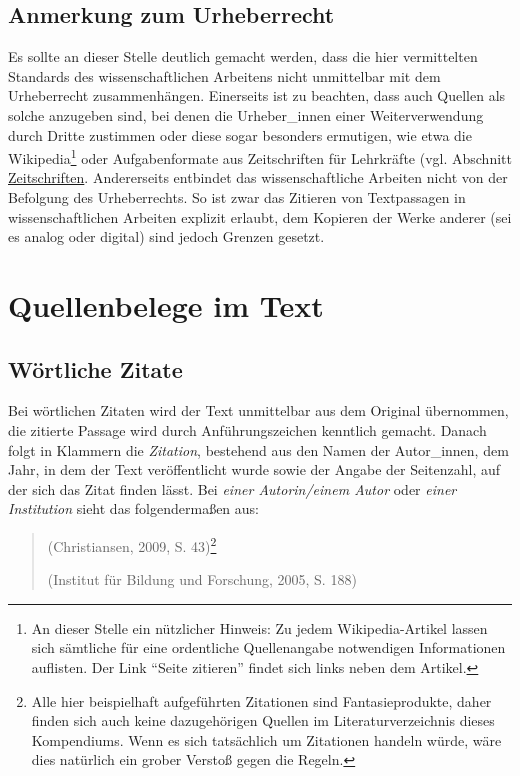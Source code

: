 \documentclass[
  bibliography=totoc,
  oneside,
  12pt,
  a4paper]{scrbook}
\begin{document}
\hypertarget{anmerkung-zum-urheberrecht}{%
\subsection*{Anmerkung zum Urheberrecht}\label{anmerkung-zum-urheberrecht}}

Es sollte an dieser Stelle deutlich gemacht werden, dass die hier
vermittelten Standards des wissenschaftlichen Arbeitens nicht
unmittelbar mit dem Urheberrecht zusammenhängen. Einerseits ist zu
beachten, dass auch Quellen als solche anzugeben sind, bei denen die
Urheber\_innen einer Weiterverwendung durch Dritte zustimmen oder diese
sogar besonders ermutigen, wie etwa die Wikipedia\footnote{An dieser Stelle ein nützlicher Hinweis: Zu jedem
  Wikipedia-Artikel lassen sich sämtliche für eine ordentliche
  Quellenangabe notwendigen Informationen auflisten. Der Link ``Seite
  zitieren'' findet sich links neben dem Artikel.} oder
Aufgabenformate aus Zeitschriften für Lehrkräfte (vgl.
Abschnitt \protect\hyperlink{zeitschriften}{Zeitschriften}. Andererseits entbindet das
wissenschaftliche Arbeiten nicht von der Befolgung des Urheberrechts. So
ist zwar das Zitieren von Textpassagen in wissenschaftlichen Arbeiten
explizit erlaubt, dem Kopieren der Werke anderer (sei es analog oder
digital) sind jedoch Grenzen gesetzt.

\hypertarget{quellenbelege-im-text}{%
\section{Quellenbelege im Text}\label{quellenbelege-im-text}}

\hypertarget{wuxf6rtliche-zitate}{%
\subsection{Wörtliche Zitate}\label{wuxf6rtliche-zitate}}

Bei wörtlichen Zitaten wird der Text unmittelbar aus dem Original
übernommen, die zitierte Passage wird durch Anführungszeichen kenntlich
gemacht. Danach folgt in Klammern die \emph{Zitation}, bestehend aus den
Namen der Autor\_innen, dem Jahr, in dem der Text veröffentlicht wurde
sowie der Angabe der Seitenzahl, auf der sich das Zitat finden lässt.
Bei \emph{einer Autorin/einem Autor} oder \emph{einer Institution} sieht das
folgendermaßen aus:

\begin{quote}
(Christiansen, 2009, S. 43)\footnote{Alle hier beispielhaft aufgeführten Zitationen sind
  Fantasieprodukte, daher finden sich auch keine dazugehörigen Quellen
  im Literaturverzeichnis dieses Kompendiums. Wenn es sich tatsächlich
  um Zitationen handeln würde, wäre dies natürlich ein grober Verstoß
  gegen die Regeln.}

(Institut für Bildung und Forschung, 2005, S. 188)
\end{quote}
\end{document}

